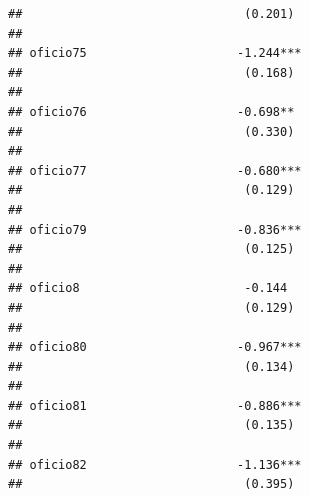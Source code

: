 \documentclass[
]{article}
\begin{document}
\begin{verbatim}
##                               (0.201)                                                               
##                                                                                                     
## oficio75                     -1.244***                                                              
##                               (0.168)                                                               
##                                                                                                     
## oficio76                     -0.698**                                                               
##                               (0.330)                                                               
##                                                                                                     
## oficio77                     -0.680***                                                              
##                               (0.129)                                                               
##                                                                                                     
## oficio79                     -0.836***                                                              
##                               (0.125)                                                               
##                                                                                                     
## oficio8                       -0.144                                                                
##                               (0.129)                                                               
##                                                                                                     
## oficio80                     -0.967***                                                              
##                               (0.134)                                                               
##                                                                                                     
## oficio81                     -0.886***                                                              
##                               (0.135)                                                               
##                                                                                                     
## oficio82                     -1.136***                                                              
##                               (0.395)                                                               

\end{verbatim}
\end{document}
